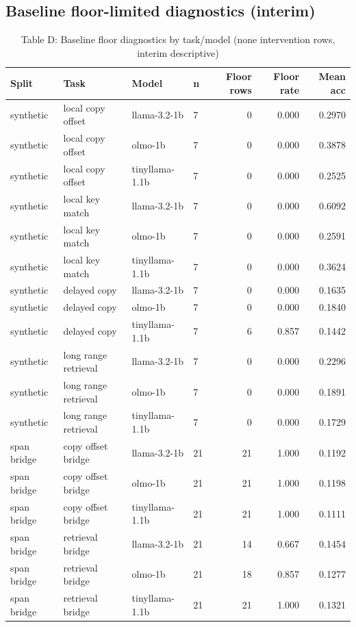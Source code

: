 \documentclass[11pt]{article}
\begin{document}
\subsection*{Baseline floor-limited diagnostics (interim)}
\begin{table}[ht]
\centering
\caption{Table D: Baseline floor diagnostics by task/model (none intervention rows, interim descriptive)}
\footnotesize
\begin{tabular}{llllrrr}
\toprule
\textbf{Split} & \textbf{Task} & \textbf{Model} & \textbf{n} & \textbf{Floor rows} & \textbf{Floor rate} & \textbf{Mean acc} \\
\midrule
synthetic & local copy offset & llama-3.2-1b & 7 & 0 & 0.000 & 0.2970 \\
synthetic & local copy offset & olmo-1b & 7 & 0 & 0.000 & 0.3878 \\
synthetic & local copy offset & tinyllama-1.1b & 7 & 0 & 0.000 & 0.2525 \\
synthetic & local key match & llama-3.2-1b & 7 & 0 & 0.000 & 0.6092 \\
synthetic & local key match & olmo-1b & 7 & 0 & 0.000 & 0.2591 \\
synthetic & local key match & tinyllama-1.1b & 7 & 0 & 0.000 & 0.3624 \\
synthetic & delayed copy & llama-3.2-1b & 7 & 0 & 0.000 & 0.1635 \\
synthetic & delayed copy & olmo-1b & 7 & 0 & 0.000 & 0.1840 \\
synthetic & delayed copy & tinyllama-1.1b & 7 & 6 & 0.857 & 0.1442 \\
synthetic & long range retrieval & llama-3.2-1b & 7 & 0 & 0.000 & 0.2296 \\
synthetic & long range retrieval & olmo-1b & 7 & 0 & 0.000 & 0.1891 \\
synthetic & long range retrieval & tinyllama-1.1b & 7 & 0 & 0.000 & 0.1729 \\
span bridge & copy offset bridge & llama-3.2-1b & 21 & 21 & 1.000 & 0.1192 \\
span bridge & copy offset bridge & olmo-1b & 21 & 21 & 1.000 & 0.1198 \\
span bridge & copy offset bridge & tinyllama-1.1b & 21 & 21 & 1.000 & 0.1111 \\
span bridge & retrieval bridge & llama-3.2-1b & 21 & 14 & 0.667 & 0.1454 \\
span bridge & retrieval bridge & olmo-1b & 21 & 18 & 0.857 & 0.1277 \\
span bridge & retrieval bridge & tinyllama-1.1b & 21 & 21 & 1.000 & 0.1321 \\
\bottomrule
\end{tabular}
\end{table}
\end{document}
